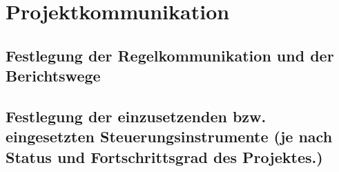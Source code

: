 
\section*{Projektkommunikation}


\subsection{Festlegung der Regelkommunikation und der Berichtswege}

\subsection{Festlegung der einzusetzenden bzw. eingesetzten Steuerungsinstrumente (je nach Status und Fortschrittsgrad des Projektes.)}